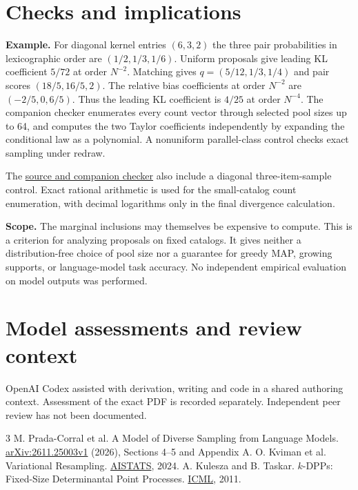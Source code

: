 \documentclass[11pt]{article}
\begin{document}
\newpage
\section{Checks and implications}
\textbf{Example.} For diagonal kernel entries $(6,3,2)$ the three pair probabilities in lexicographic order are $(1/2,1/3,1/6)$. Uniform proposals give leading KL coefficient $5/72$ at order $N^{-2}$. Matching gives $q=(5/12,1/3,1/4)$ and pair scores $(18/5,16/5,2)$. The relative bias coefficients at order $N^{-2}$ are $(-2/5,0,6/5)$. Thus the leading KL coefficient is $4/25$ at order $N^{-4}$. The companion checker enumerates every count vector through selected pool sizes up to 64, and computes the two Taylor coefficients independently by expanding the conditional law as a polynomial. A nonuniform parallel-class control checks exact sampling under redraw.

The \href{https://github.com/lluiseriksson/THE-ERIKSSON-PROGRAMME/tree/codex/pool-bias-20261120/audits/pool-dpp}{source and companion checker} also include a diagonal three-item-sample control. Exact rational arithmetic is used for the small-catalog count enumeration, with decimal logarithms only in the final divergence calculation.

\textbf{Scope.} The marginal inclusions may themselves be expensive to compute. This is a criterion for analyzing proposals on fixed catalogs. It gives neither a distribution-free choice of pool size nor a guarantee for greedy MAP, growing supports, or language-model task accuracy. No independent empirical evaluation on model outputs was performed.

\section*{Model assessments and review context}
OpenAI Codex assisted with derivation, writing and code in a shared authoring context. Assessment of the exact PDF is recorded separately. Independent peer review has not been documented.
\begin{thebibliography}{3}\setlength{\itemsep}{0pt}\small
{} M. Prada-Corral et al. A Model of Diverse Sampling from Language Models. \href{https://arxiv.org/abs/2611.25003v1}{arXiv:2611.25003v1} (2026), Sections 4--5 and Appendix A.
 O. Kviman et al. Variational Resampling. \href{https://proceedings.mlr.press/v238/kviman24a.html}{AISTATS}, 2024.
 A. Kulesza and B. Taskar. $k$-DPPs: Fixed-Size Determinantal Point Processes. \href{https://icml.cc/2011/papers/611_icmlpaper.pdf}{ICML}, 2011.
\end{thebibliography}
\end{document}
